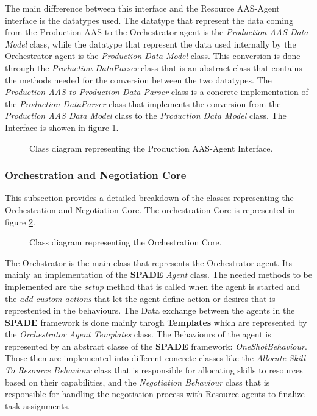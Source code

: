 The main diffrerence between this interface and the Resource AAS-Agent interface is the datatypes used.
The datatype that represent the data coming from the Production AAS to the Orchestrator agent is the \emph{Production AAS Data Model} class, while the datatype that represent the data used internally by the Orchestrator agent is the \emph{Production Data Model} class.
This conversion is done through the \emph{Production DataParser} class that is an abstract class that contains the methods needed for the conversion between the two datatypes.
The \emph{Production AAS to Production Data Parser} class is a concrete implementation of the \emph{Production DataParser} class that implements the conversion from the \emph{Production AAS Data Model} class to the \emph{Production Data Model} class.
The Interface is showen in figure \ref{fig:prod_aas_agent_interface_classes}.
\begin{figure}[ht]
    \centering  
    
    \caption{Class diagram representing the Production AAS-Agent Interface.}
    \label{fig:prod_aas_agent_interface_classes}
\end{figure}

\newpage
\subsubsection{Orchestration and Negotiation Core}

This subsection provides a detailed breakdown of the classes representing the Orchestration and Negotiation Core.
The orchestration Core is represented in figure \ref{fig:orchestration_core_classes}.
\begin{figure}[ht]
    \centering  
    
    \caption{Class diagram representing the Orchestration Core.}
    \label{fig:orchestration_core_classes}
\end{figure}
The Orchstrator is the main class that represents the Orchestrator agent.
Its mainly an implementation of the \textbf{SPADE} \emph{Agent} class.
The needed methods to be implemented are the \emph{setup} method that is called when the agent is started and the \emph{add custom actions} that let the agent define action or desires that is represtented in the behaviours.
The Data exchange between the agents in the \textbf{SPADE} framework is done mainly throgh \textbf{Templates} which are represented by the \emph{Orchestrator Agent Templates} class.
The Behaviours of the agent is represented by an abstract classe of the \textbf{SPADE} framework: \emph{OneShotBehaviour}.
Those then are implemented into different concrete classes like the \emph{Allocate Skill To Resource Behaviour} class that is responsible for allocating skills to resources based on their capabilities, and the \emph{Negotiation Behaviour} class that is responsible for handling the negotiation process with Resource agents to finalize task assignments.

